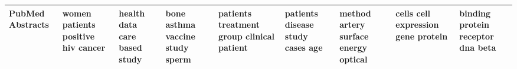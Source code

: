 \documentclass[11pt,a4paper]{article}
\begin{document}
\begin{appendices}
\begin{table*}[htb]
\begin{tiny}
\begin{tabular}{|p{}|p{}|p{}|p{}|p{}|p{}|p{}|p{}|p{}|}
    PubMed Abstracts & women \newline patients \newline positive \newline hiv \newline cancer & health \newline data \newline care \newline based \newline study & bone \newline asthma \newline vaccine \newline study \newline sperm & patients \newline treatment \newline group \newline clinical \newline patient & patients \newline disease \newline study \newline cases \newline age & method \newline artery \newline surface \newline energy \newline optical & cells \newline cell \newline expression \newline gene \newline protein & binding \newline protein \newline receptor \newline dna \newline beta\\\hline

\end{tabular}
\end{tiny}
\end{table*}
\end{appendices}
\end{document}
